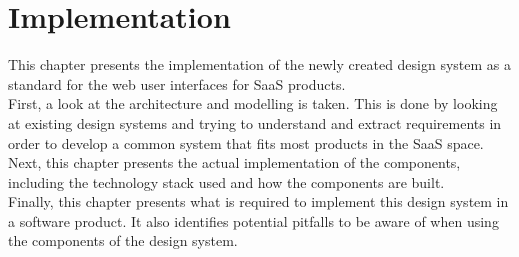 \section{Implementation}
This chapter presents the implementation of the newly created design system as a standard for the web user interfaces for SaaS products. \\
First, a look at the architecture and modelling is taken. This is done by looking at existing design systems and trying to understand and extract requirements in order to develop a common system that fits most products in the SaaS space. \\
Next, this chapter presents the actual implementation of the components, including the technology stack used and how the components are built. \\
Finally, this chapter presents what is required to implement this design system in a software product. It also identifies potential pitfalls to be aware of when using the components of the design system. \\



